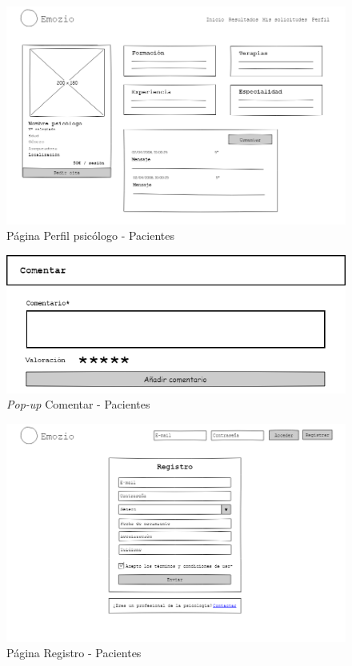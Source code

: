 \begin{figure}[htbp] 
    \centering
    \includegraphics[width=1\textwidth]{figuras/mockup_pacientes/perfil_psicologo.png}
    \caption{Página Perfil psicólogo - Pacientes}
\end{figure}	

\begin{figure}[htbp] 
    \centering
    \includegraphics[width=1\textwidth]{figuras/mockup_pacientes/comentar.png}
    \caption{\textit{Pop-up} Comentar - Pacientes}
\end{figure}	

\begin{figure}[htbp] 
    \centering
    \includegraphics[width=1\textwidth]{figuras/mockup_pacientes/registro.png}
    \caption{Página Registro - Pacientes}
\end{figure}	

